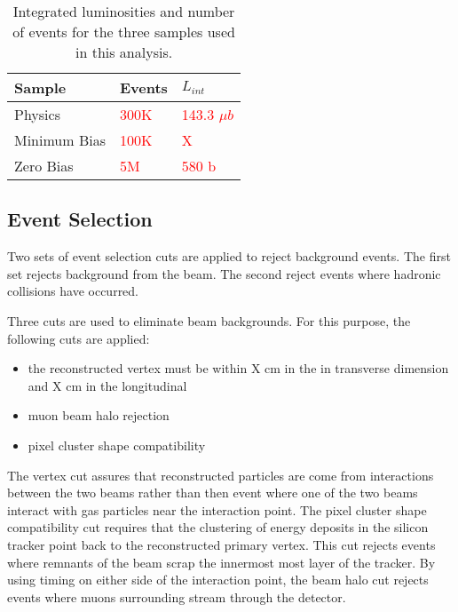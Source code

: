     \begin{table}
	    \centering
	    \begin{tabular}{|l|l|l|}
	      \hline Sample & Events & $L_{int}$ \\ \hline \hline
	      Physics & \textcolor{red}{300K} & \textcolor{red}{143.3 
	        $\mu$$b$} \\ \hline
	      Minimum Bias & \textcolor{red}{100K} & \textcolor{red}{X} \\ \hline
	      Zero Bias & \textcolor{red}{5M} & \textcolor{red}{580 b} \\ \hline \hline
	    \end{tabular}
	    \caption{Integrated luminosities and number of events for the three
	      samples used in this analysis.}
	    \label{tab:sampleLumiNevt}
    \end{table}

  \subsection{Event Selection}
    Two sets of event selection cuts are applied to reject background events. 
    The first set rejects background from the beam.
    The second reject events where hadronic collisions have occurred.
    
    Three cuts are used to eliminate beam backgrounds.
    For this purpose, the following cuts are applied:
    \begin{itemize}
	    \item the reconstructed vertex must be within X cm in the in 
		    transverse dimension and X cm in the longitudinal
	    \item muon beam halo rejection
	    \item pixel cluster shape compatibility
    \end{itemize}
    The vertex cut assures that reconstructed particles are come from 
      interactions between the two beams rather than then event where one of
      the two beams interact with gas particles near the interaction point. 
    The pixel cluster shape compatibility cut requires that the clustering
      of energy deposits in the silicon tracker point back to the reconstructed
      primary vertex. 
    This cut rejects events where remnants of the beam scrap the innermost 
      most layer of the tracker. 
    By using timing on either side of the interaction point, the beam halo cut
      rejects events where muons surrounding stream through the detector. 

